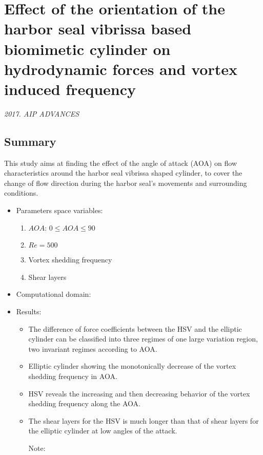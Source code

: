 \documentclass[preprint, letterpaper, nobibnotes, aps, superscriptaddress,prb]{revtex4-1}
\begin{document}
\clearpage


\section{Effect of the orientation of the harbor seal vibrissa based biomimetic cylinder on hydrodynamic forces and vortex induced frequency}

\textit{2017. AIP ADVANCES}

\subsection{Summary}
This study aims at finding the effect of the angle of attack (AOA) on flow characteristics around the harbor seal vibrissa shaped cylinder, to cover the change of flow direction during the harbor seal’s movements and surrounding conditions.
\begin{itemize}
\item
Parameters space variables: 
\begin{enumerate}
\item 
$AOA$: $0\leq AOA \leq 90$
\item 
$Re = 500$
\item 
Vortex shedding frequency
\item 
Shear layers
\end{enumerate}
\item
Computational domain: 
\begin{figure}[H]
  \centering {}
  \caption{}\label{fig1}
\end{figure}
\item
Results: 
\begin{itemize}
	\item
	The difference of force coefficients between the HSV and the elliptic cylinder can be classified into three regimes of one large variation region, two invariant regimes according to AOA.

	\item Elliptic cylinder showing the monotonically decrease of the vortex shedding frequency in AOA.

	\item HSV reveals the increasing and then decreasing behavior of the vortex shedding frequency along the AOA.

	\item The shear layers for the HSV is much longer than that of shear layers for the elliptic cylinder at low angles of the attack.

Note:

\end{itemize}
\end{itemize}
\end{document}
